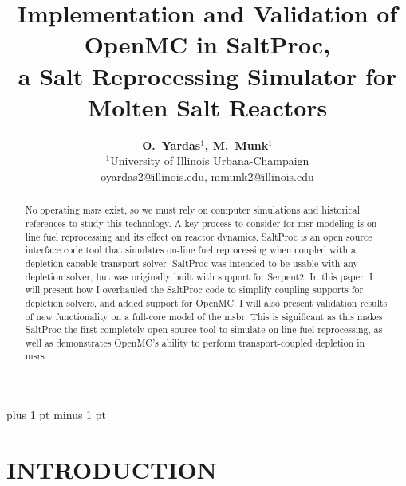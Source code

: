 \documentclass[letterpaper]{mc2023}
\title{Implementation and Validation of OpenMC in SaltProc,\\
a Salt Reprocessing Simulator for Molten Salt Reactors}
\author{%
  \textbf{O.~Yardas$^1$, M.~Munk$^1$}\vspace{3pt} \\
  $^1$University of Illinois Urbana-Champaign  \\
  \url{oyardas2@illinois.edu}, \url{mmunk2@illinois.edu}
}
\begin{document}

\maketitle
\justify 
\parskip 6pt plus 1 pt minus 1 pt

\begin{abstract}
  No operating \Gls{msr}s exist, so we must rely on computer simulations and historical references
  to study this technology. A key process to consider for \Gls{msr} modeling is on-line fuel
  reprocessing and its effect on reactor dynamics. SaltProc is an open source
  interface code tool that simulates on-line fuel reprocessing when coupled with
  a depletion-capable transport solver. SaltProc was intended to be usable with
  any depletion solver, but was originally built with support for Serpent2. 
  In this paper, I will present how I overhauled the
  SaltProc code to simplify coupling supports for depletion solvers, and added
  support for OpenMC. I will also present validation results of new functionality on a full-core model
  of the \Gls{msbr}. This is significant as this makes SaltProc the first
  completely open-source tool to simulate on-line fuel reprocessing, as well as demonstrates OpenMC's
  ability to perform transport-coupled depletion in \Gls{msr}s.
\end{abstract}
\vspace{6pt}

\section{INTRODUCTION} 
\end{document}
